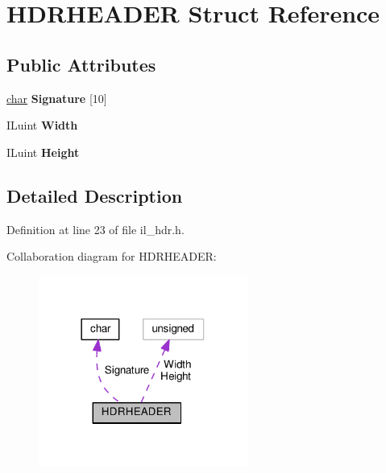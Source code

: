 \hypertarget{structHDRHEADER}{}\section{H\+D\+R\+H\+E\+A\+D\+ER Struct Reference}
\label{structHDRHEADER}
\subsection*{Public Attributes}
\begin{DoxyCompactItemize}
\item 
\mbox{\label{structHDRHEADER_aa98220223d3ab33d9203a7fe0dc2ba3b}} 
\hyperlink{classchar}{char} {\bfseries Signature} \mbox{[}10\mbox{]}
\item 
\mbox{\label{structHDRHEADER_abb591ce14fac026e0adcb8d6c96c6da9}} 
I\+Luint {\bfseries Width}
\item 
\mbox{\label{structHDRHEADER_a3efe6fd72775bf1fcf2ac9010732b851}} 
I\+Luint {\bfseries Height}
\end{DoxyCompactItemize}


\subsection{Detailed Description}


Definition at line 23 of file il\+\_\+hdr.\+h.



Collaboration diagram for H\+D\+R\+H\+E\+A\+D\+ER\+:
\nopagebreak
\begin{figure}[H]
\begin{center}
\leavevmode
\includegraphics[width=194pt]{d6/dd8/structHDRHEADER__coll__graph}
\end{center}
\end{figure}


